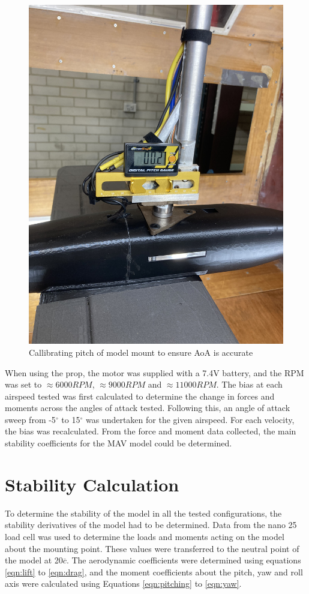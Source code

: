 \begin{figure}[H]
    \centering
    \includegraphics[scale=0.05]{04_Methodology/Figs/pitchGauge.jpg}
    \caption{Callibrating pitch of model mount to ensure AoA is accurate}
    \label{fig:pitchGauge}
\end{figure}


When using the prop, the motor was supplied with a 7.4V battery, and the RPM was set to $\approx 6000 RPM$, $\approx 9000RPM$ and $\approx 11000 RPM$. The bias at each airspeed tested was first calculated to determine the change in forces and moments across the angles of attack tested. Following this, an angle of attack sweep from -5$^{\circ}$ to 15$^{\circ}$ was undertaken for the given airspeed. For each velocity, the bias was recalculated. From the force and moment data collected, the main stability coefficients for the MAV model could be determined.


\section{Stability Calculation}
To determine the stability of the model in all the tested configurations, the stability derivatives of the model had to be determined. Data from the nano 25 load cell was used to determine the loads and moments acting on the model about the mounting point. These values were transferred to the neutral point of the model at 20$\overline{c}$. The aerodynamic coefficients were determined using equations \ref{eqn:lift} to \ref{eqn:drag}, and the moment coefficients about the pitch, yaw and roll axis were calculated using Equations \ref{eqn:pitching} to \ref{eqn:yaw}. 




